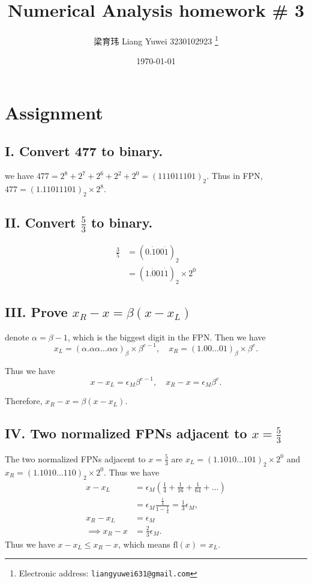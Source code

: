 \documentclass[a4paper]{article}
\newcommand{\esm}{\epsilon_M}
\newcommand{\fl}{\text{fl}}
\begin{document}
\title{Numerical Analysis homework \# 3}

\author{梁育玮 Liang Yuwei 3230102923
  \thanks{Electronic address: \texttt{liangyuwei631@gmail.com}}}
\date{\today}

\maketitle


\section{Assignment}
\subsection*{I. Convert 477 to binary.}
we have $477 = 2^8 + 2^7 + 2^6 + 2^2 + 2^0 = (111011101)_2$. Thus in FPN, $477 = (1.11011101)_2 \times 2^8$.

\subsection*{II. Convert $\frac{5}{3}$ to binary.}
\begin{align*} 
  \frac{3}{5} &= (0.\dot{1}00\dot{1})_2 \\
  &= (1.\dot{0}01\dot{1} )_2 \times 2^0
\end{align*}

\subsection*{III. Prove $x_R - x = \beta(x - x_L)$}
denote $\alpha = \beta -1$, which is the biggest digit in the FPN. Then we have
\[x_L = (\alpha.\alpha\alpha\ldots\alpha\alpha)_{\beta} \times \beta^{e-1},\quad x_R = (1.00\ldots 01)_{\beta} \times \beta^{e} .\]

Thus we have
\[x - x_L = \epsilon_M \beta^{e-1},\quad x_R - x = \epsilon_M \beta^{e}.\]

Therefore, $x_R - x = \beta(x - x_L)$.

\subsection*{IV. Two normalized FPNs adjacent to $x = \frac{5}{3}$}
The two normalized FPNs adjacent to $x = \frac{5}{3}$ are $x_L = (1.1010\dots101)_2 \times 2^0$ and $x_R = (1.1010\dots110)_2 \times 2^0$. 
Thus we have \begin{align*}
  x - x_L &= \epsilon_M (\frac{1}{4} + \frac{1}{16} + \frac{1}{64} + \dots)\\
&= \esm \frac{\frac{1}{4}}{1-\frac{1}{4}} = \frac{1}{3} \esm,\\
  x_R - x_L &= \esm\\
  \implies x_R - x &= \frac{2}{3} \esm.
\end{align*}  
Thus we have $x - x_L \le x_R -x$, which means $\fl(x) = x_L$.
\end{document}
